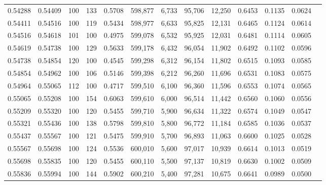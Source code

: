 \begin{tabular}{rrrrrrrrrrrrr}
0.54288 & 0.54409 &   100 & 133 &                                     0.5708 & 598,877 &   6,733 &  95,706 &  12,250 & 0.6453 & 0.1135 & 0.0624 \\
0.54411 & 0.54516 &   100 & 119 &                                     0.5434 & 598,977 &   6,633 &  95,825 &  12,131 & 0.6465 & 0.1124 & 0.0614 \\
0.54516 & 0.54618 &   101 & 100 &                                     0.4975 & 599,078 &   6,532 &  95,925 &  12,031 & 0.6481 & 0.1114 & 0.0605 \\
0.54619 & 0.54738 &   100 & 129 &                                     0.5633 & 599,178 &   6,432 &  96,054 &  11,902 & 0.6492 & 0.1102 & 0.0596 \\
0.54738 & 0.54854 &   120 & 100 &                                     0.4545 & 599,298 &   6,312 &  96,154 &  11,802 & 0.6515 & 0.1093 & 0.0585 \\
0.54854 & 0.54962 &   100 & 106 &                                     0.5146 & 599,398 &   6,212 &  96,260 &  11,696 & 0.6531 & 0.1083 & 0.0575 \\
0.54964 & 0.55065 &   112 & 100 &                                     0.4717 & 599,510 &   6,100 &  96,360 &  11,596 & 0.6553 & 0.1074 & 0.0565 \\
0.55065 & 0.55208 &   100 & 154 &                                     0.6063 & 599,610 &   6,000 &  96,514 &  11,442 & 0.6560 & 0.1060 & 0.0556 \\
0.55209 & 0.55320 &   100 & 120 &                                     0.5455 & 599,710 &   5,900 &  96,634 &  11,322 & 0.6574 & 0.1049 & 0.0547 \\
0.55321 & 0.55436 &   100 & 138 &                                     0.5798 & 599,810 &   5,800 &  96,772 &  11,184 & 0.6585 & 0.1036 & 0.0537 \\
0.55437 & 0.55567 &   100 & 121 &                                     0.5475 & 599,910 &   5,700 &  96,893 &  11,063 & 0.6600 & 0.1025 & 0.0528 \\
0.55567 & 0.55698 &   100 & 124 &                                     0.5536 & 600,010 &   5,600 &  97,017 &  10,939 & 0.6614 & 0.1013 & 0.0519 \\
0.55698 & 0.55835 &   100 & 120 &                                     0.5455 & 600,110 &   5,500 &  97,137 &  10,819 & 0.6630 & 0.1002 & 0.0509 \\
0.55836 & 0.55994 &   100 & 144 &                                     0.5902 & 600,210 &   5,400 &  97,281 &  10,675 & 0.6641 & 0.0989 & 0.0500 \\

\end{tabular}
